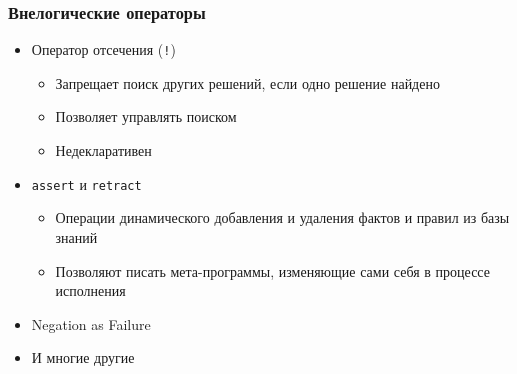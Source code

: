 \documentclass{../../slides-style}
\begin{document}
    \begin{frame}
        \frametitle{Внелогические операторы}
    \begin{itemize}
        \item Оператор отсечения (\texttt{!})
        \begin{itemize}
            \item Запрещает поиск других решений, если одно решение найдено
            \item Позволяет управлять поиском
            \item Недекларативен
        \end{itemize}
        \vspace{2mm}
        \item \texttt{assert} и \texttt{retract}
        \begin{itemize}
            \item Операции динамического добавления и удаления фактов и правил из базы знаний
            \item Позволяют писать мета-программы, изменяющие сами себя в процессе исполнения
        \end{itemize}
        \vspace{2mm}
        \item Negation as Failure
        \vspace{2mm}
        \item И многие другие
    \end{itemize}
    \end{frame}
\end{document}
